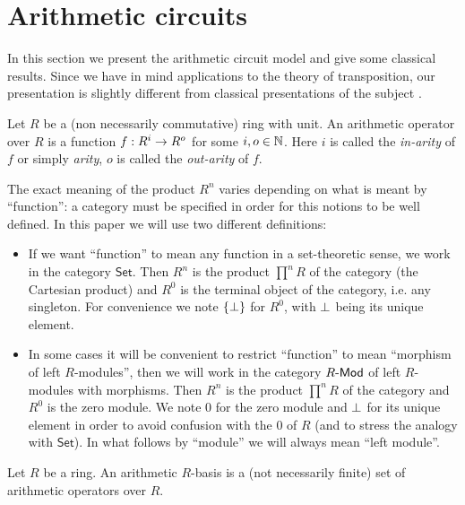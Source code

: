 \section{Arithmetic circuits}
\label{sec:circuits}

In this section we present the arithmetic circuit model and give some
classical results. Since we have in mind applications to the theory of
transposition, our presentation is slightly different from classical
presentations of the subject \cite{BuClSh, Vollmer}.

\begin{definition}
  Let $R$ be a (non necessarily commutative) ring with unit. An
  arithmetic operator over $R$ is a function $f:R^i\rightarrow R^o$ for some
  $i,o\in\mathbb{N}$.  Here $i$ is called the \emph{in-arity} of $f$ or simply
  \emph{arity}, $o$ is called the \emph{out-arity} of $f$.
\end{definition}

The exact meaning of the product $R^n$ varies depending on what is
meant by ``function'': a category must be specified in order for this
notions to be well defined. In this paper we will use two different
definitions:
\begin{itemize}
\item If we want ``function'' to mean any function in a set-theoretic
  sense, we work in the category $\mathsf{Set}$. Then $R^n$ is the
  product $\prod^nR$ of the category (the Cartesian product) and $R^0$
  is the terminal object of the category, i.e. any singleton. For
  convenience we note $\{\perp\}$ for $R^0$, with $\perp$ being its
  unique element.
\item In some cases it will be convenient to restrict ``function'' to
  mean ``morphism of left $R$-modules'', then we will work in the
  category $R\text{\sf-Mod}$ of left $R$-modules with morphisms. Then $R^n$
  is the product $\prod^nR$ of the category and $R^0$ is the zero
  module.  We note $0$ for the zero module and $\perp$ for its unique
  element in order to avoid confusion with the $0$ of $R$ (and to
  stress the analogy with $\mathsf{Set}$). In what follows by
  ``module'' we will always mean ``left module''.
\end{itemize}

\begin{definition}
  Let $R$ be a ring.  An arithmetic $R$-basis is a (not necessarily
  finite) set of arithmetic operators over $R$.
\end{definition}

